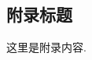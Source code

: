 \begin{appendices}
    \renewcommand{\thesection}{\Alph{section}}
    \section{附录标题}
        这里是附录内容. 
\end{appendices}